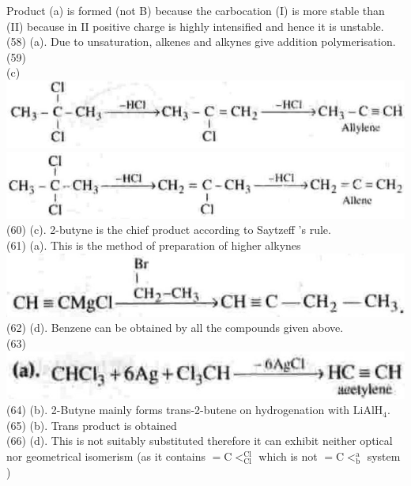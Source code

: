 \documentclass[10pt]{article}
\begin{document}
Product (a) is formed (not B) because the carbocation (I) is more stable than (II) because in II positive charge is highly intensified and hence it is unstable.\\
(58) (a). Due to unsaturation, alkenes and alkynes give addition polymerisation.\\
(59)\\
(c)\\
\includegraphics[max width=\textwidth, center]{2025_01_28_8470952b98110cec3aabg-243(6)}\\
\includegraphics[max width=\textwidth, center]{2025_01_28_8470952b98110cec3aabg-243(12)}\\
(60) (c). 2-butyne is the chief product according to Saytzeff 's rule.\\
(61) (a). This is the method of preparation of higher alkynes\\
\includegraphics[max width=\textwidth, center]{2025_01_28_8470952b98110cec3aabg-243(8)}\\
(62) (d). Benzene can be obtained by all the compounds given above.\\
(63)\\
\includegraphics[max width=\textwidth, center]{2025_01_28_8470952b98110cec3aabg-243(2)}\\
(64) (b). 2-Butyne mainly forms trans-2-butene on hydrogenation with $\mathrm{LiAlH}_{4}$.\\
(65) (b). Trans product is obtained\\
(66) (d). This is not suitably substituted therefore it can exhibit neither optical nor geometrical isomerism (as it contains $=\mathrm{C}<_{\mathrm{Cl}}^{\mathrm{Cl}}$ which is not $=\mathrm{C}<_{\mathrm{b}}^{\mathrm{a}}$ system )\\
\end{document}
